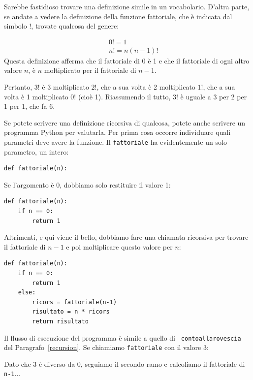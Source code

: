 \documentclass[10pt]{book}
\begin{document}
Sarebbe fastidioso trovare una definizione simile in un vocabolario.
D'altra parte, se andate a vedere la definizione della funzione fattoriale, che è indicata dal simbolo $!$, trovate qualcosa del genere:

%
\begin{eqnarray*}
&&  0! = 1 \\
&&  n! = n (n-1)!
\end{eqnarray*}
%
Questa definizione afferma che il fattoriale di 0 è 1 e che il fattoriale di ogni altro valore $n$, è $n$ moltiplicato per il fattoriale di $n-1$.

Pertanto, $3!$ è 3 moltiplicato $2!$, che a sua volta è 2 moltiplicato $1!$, che
   a sua volta è 1 moltiplicato $0!$ (cioè 1). Riassumendo il tutto, $3!$ è uguale a 3 per 2 per 1 per 1, che fa 6.

Se potete scrivere una definizione ricorsiva di qualcosa, potete anche scrivere un programma Python per valutarla. Per prima cosa occorre individuare quali parametri deve avere la funzione. Il {\tt fattoriale} ha evidentemente un solo parametro, un intero:

\begin{verbatim}
def fattoriale(n):
\end{verbatim}
%
Se l'argomento è 0, dobbiamo solo restituire il valore 1:

\begin{verbatim}
def fattoriale(n):
    if n == 0:
        return 1
\end{verbatim}
%
Altrimenti, e qui viene il bello, dobbiamo fare una chiamata ricorsiva per trovare il fattoriale di $n-1$ e poi moltiplicare questo valore per $n$:

\begin{verbatim}
def fattoriale(n):
    if n == 0:
        return 1
    else:
        ricors = fattoriale(n-1)
        risultato = n * ricors
        return risultato
\end{verbatim}
%
Il flusso di esecuzione del programma è simile a quello di {\tt
contoallarovescia} del Paragrafo~\ref{recursion}. Se chiamiamo {\tt fattoriale}
con il valore 3:

Dato che 3 è diverso da 0, seguiamo il secondo ramo e calcoliamo il fattoriale
   di {\tt n-1}...
\end{document}
